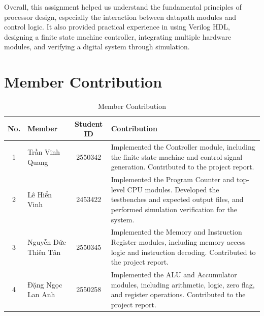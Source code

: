 Overall, this assignment helped us understand the fundamental principles of processor design, especially the interaction between datapath modules and control logic. It also provided practical experience in using Verilog HDL, designing a finite state machine controller, integrating multiple hardware modules, and verifying a digital system through simulation.

\section{Member Contribution}
\begin{table}[H]
	\centering
	\caption{Member Contribution}
	\begin{tabular}{|c|l|c|p{7.5cm}|}
		\hline
		\textbf{No.} & \textbf{Member}      & \textbf{Student ID} & \textbf{Contribution}                                                                                                                                                 \\
		\hline
		1            & Trần Vinh Quang      & 2550342             & Implemented the Controller module, including the finite state machine and control signal generation. \newline Contributed to the project report.                      \\
		\hline
		2            & Lê Hiển Vinh         & 2453422             & Implemented the Program Counter and top-level CPU modules. Developed the testbenches and expected output files, and performed simulation verification for the system. \\
		\hline
		3            & Nguyễn Đức Thiên Tân & 2550345             & Implemented the Memory and Instruction Register modules, including memory access logic and instruction decoding. \newline Contributed to the project report.          \\
		\hline
		4            & Đặng Ngọc Lan Anh    & 2550258             & Implemented the ALU and Accumulator modules, including arithmetic, logic, zero flag, and register operations. \newline Contributed to the project report.             \\
		\hline
	\end{tabular}
\end{table}
